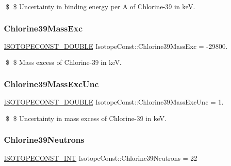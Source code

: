 \$ \$ Uncertainty in binding energy per A of Chlorine-\/39 in keV. \mbox{\label{group___isotope_const-_chlorine-_cl39_ga045afb8b19333357bab57b09764fb0f9}} 
\subsubsection{\texorpdfstring{Chlorine39\+Mass\+Exc}{Chlorine39MassExc}}
{\footnotesize\ttfamily \mbox{\hyperlink{group___isotope_const-_macros_ga8f45a7272ce02c0b4c65c44636ed719a}{I\+S\+O\+T\+O\+P\+E\+C\+O\+N\+S\+T\+\_\+\+D\+O\+U\+B\+LE}} Isotope\+Const\+::\+Chlorine39\+Mass\+Exc = -\/29800.}

\$ \$ Mass excess of Chlorine-\/39 in keV. \mbox{\label{group___isotope_const-_chlorine-_cl39_gaac109d4d622636bf01c0c086b287e155}} 
\subsubsection{\texorpdfstring{Chlorine39\+Mass\+Exc\+Unc}{Chlorine39MassExcUnc}}
{\footnotesize\ttfamily \mbox{\hyperlink{group___isotope_const-_macros_ga8f45a7272ce02c0b4c65c44636ed719a}{I\+S\+O\+T\+O\+P\+E\+C\+O\+N\+S\+T\+\_\+\+D\+O\+U\+B\+LE}} Isotope\+Const\+::\+Chlorine39\+Mass\+Exc\+Unc = 1.}

\$ \$ Uncertainty in mass excess of Chlorine-\/39 in keV. \mbox{\label{group___isotope_const-_chlorine-_cl39_gabc04aeb55b9c2d9dc93811a64dc29941}} 
\subsubsection{\texorpdfstring{Chlorine39\+Neutrons}{Chlorine39Neutrons}}
{\footnotesize\ttfamily \mbox{\hyperlink{group___isotope_const-_macros_ga5f18360b3e99483a35c32d789e62621c}{I\+S\+O\+T\+O\+P\+E\+C\+O\+N\+S\+T\+\_\+\+I\+NT}} Isotope\+Const\+::\+Chlorine39\+Neutrons = 22}

